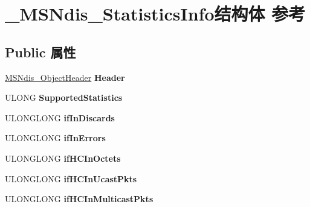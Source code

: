 \hypertarget{struct___m_s_ndis___statistics_info}{}\section{\+\_\+\+M\+S\+Ndis\+\_\+\+Statistics\+Info结构体 参考}
\label{struct___m_s_ndis___statistics_info}
\subsection*{Public 属性}
\begin{DoxyCompactItemize}
\item 
\mbox{\label{struct___m_s_ndis___statistics_info_af00710a46f3e9726071f7470ed0cfdf3}} 
\hyperlink{struct___m_s_ndis___object_header}{M\+S\+Ndis\+\_\+\+Object\+Header} {\bfseries Header}
\item 
\mbox{\label{struct___m_s_ndis___statistics_info_a440366ee8ff99c9471868943af8c8963}} 
U\+L\+O\+NG {\bfseries Supported\+Statistics}
\item 
\mbox{\label{struct___m_s_ndis___statistics_info_af573535ddfddb181cb6631b5ff086fe3}} 
U\+L\+O\+N\+G\+L\+O\+NG {\bfseries if\+In\+Discards}
\item 
\mbox{\label{struct___m_s_ndis___statistics_info_ab38fe4d21b0fb9f4e300693cb9c8ca44}} 
U\+L\+O\+N\+G\+L\+O\+NG {\bfseries if\+In\+Errors}
\item 
\mbox{\label{struct___m_s_ndis___statistics_info_a59dcb7c00b60a6bcf214ac7a63785c8e}} 
U\+L\+O\+N\+G\+L\+O\+NG {\bfseries if\+H\+C\+In\+Octets}
\item 
\mbox{\label{struct___m_s_ndis___statistics_info_a14dc31a6b09ecf8d1db5ec915bb4727f}} 
U\+L\+O\+N\+G\+L\+O\+NG {\bfseries if\+H\+C\+In\+Ucast\+Pkts}
\item 
\mbox{\label{struct___m_s_ndis___statistics_info_a8fc3727df3a5e322ec60eb2aff5d0143}} 
U\+L\+O\+N\+G\+L\+O\+NG {\bfseries if\+H\+C\+In\+Multicast\+Pkts}

\end{DoxyCompactItemize}
